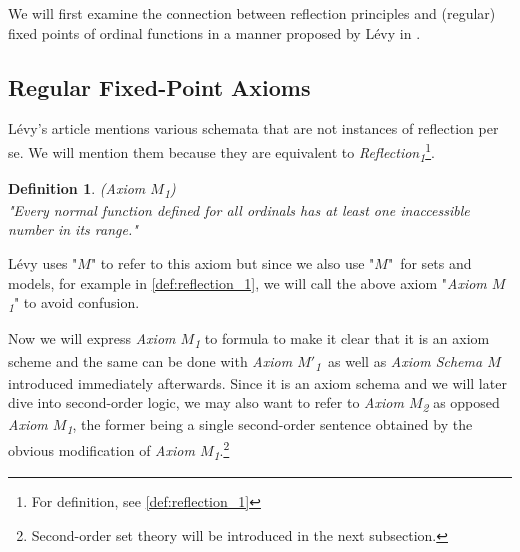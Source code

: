 \documentclass[12pt,a4paper]{article}
\newtheorem{definition}[theorem]{Definition}
\begin{document}
We will first examine the connection between reflection principles and (regular) fixed points of ordinal functions in a manner proposed by Lévy in \cite{Levy60a}. %


\subsection{Regular Fixed-Point Axioms}\label{sec:regular_fixed_points}

Lévy's article mentions various schemata that are not instances of reflection per se. We will mention them because they are equivalent to \emph{Reflection\textsubscript{1}}\footnote{For definition, see \ref{def:reflection_1}}.

\begin{definition}{(\emph{Axiom $M$\textsubscript{1}})}\label{def:levy_m}\\
"Every normal function defined for all ordinals has at least one inaccessible number in its range."
\end{definition}
Lévy uses "$M$" to refer to this axiom but since we also use "$M$" for sets and models, for example in \ref{def:reflection_1}, we will call the above axiom "\emph{Axiom $M$\textsubscript{1}}" to avoid confusion.

Now we will express \emph{Axiom $M$\textsubscript{1}} to formula to make it clear that it is an axiom scheme and the same can be done with \emph{Axiom $M'$\textsubscript{1}} as well as \emph{Axiom Schema $M$} introduced immediately afterwards. Since it is an axiom schema and we will later dive into second-order logic, we may also want to refer to \emph{Axiom $M$\textsubscript{2}} as opposed \emph{Axiom $M$\textsubscript{1}}, the former being a single second-order sentence obtained by the obvious modification of \emph{Axiom $M$\textsubscript{1}}.\footnote{Second-order set theory will be introduced in the next subsection.}
\end{document}
